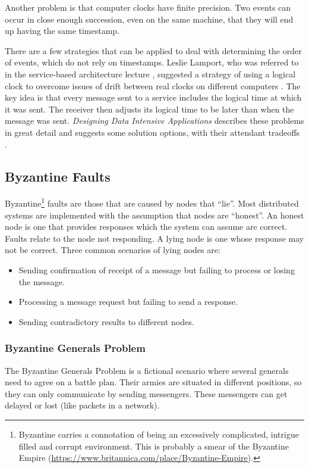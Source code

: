 Another problem is that computer clocks have finite precision.
Two events can occur in close enough succession, even on the same machine, that they will end up having the same timestamp.

There are a few strategies that can be applied to deal with determining the order of events, which do not rely on timestamps.
Leslie Lamport, who was referred to in the service-based architecture lecture \cite{service-based-slides},
suggested a strategy of using a logical clock to overcome issues of drift
between real clocks on different computers \cite{LamportLeslie1978Tcat}.
The key idea is that every message sent to a service includes the logical time at which it was sent.
The receiver then adjusts its logical time to be later than when the message was sent.
\textit{Designing Data Intensive Applications} describes these problems in great detail
and suggests some solution options, with their attendant tradeoffs \cite{data-intensive}.

\subsection{Byzantine Faults}\label{sec:byzantine}

Byzantine\footnote{Byzantine carries a connotation of being an excessively complicated, intrigue filled and corrupt environment.
This is probably a smear of the Byzantine Empire (\url{https://www.britannica.com/place/Byzantine-Empire}).}
faults are those that are caused by nodes that ``lie''.
Most distributed systems are implemented with the assumption that nodes are ``honest''.
An honest node is one that provides responses which the system can assume are correct.
Faults relate to the node not responding.
A lying node is one whose response may not be correct.
Three common scenarios of lying nodes are:
\begin{itemize}[topsep=5pt,parsep=2pt]
    \item Sending confirmation of receipt of a message but failing to process or losing the message.
    \item Processing a message request but failing to send a response.
    \item Sending contradictory results to different nodes.
\end{itemize}

\subsubsection*{Byzantine Generals Problem}
The Byzantine Generals Problem \cite{byzantine-generals} is a fictional scenario where several generals need to agree on a battle plan.
Their armies are situated in different positions, so they can only communicate by sending messengers.
These messengers can get delayed or lost (like packets in a network).

